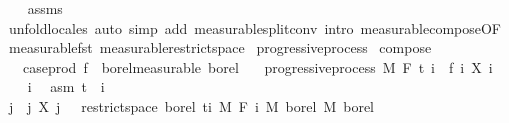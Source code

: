 \begin{isabellebody}
%
\isadelimproof
\ \ %
\endisadelimproof
%
\isatagproof
{}\isamarkupfalse%
\ assms\ \isamarkupfalse%
\ {\isacharparenleft}{\kern0pt}unfold{\isacharunderscore}{\kern0pt}locales{\isacharparenright}{\kern0pt}\ {\isacharparenleft}{\kern0pt}auto\ simp\ add{\isacharcolon}{\kern0pt}\ measurable{\isacharunderscore}{\kern0pt}split{\isacharunderscore}{\kern0pt}conv\ intro{\isacharbang}{\kern0pt}{\isacharcolon}{\kern0pt}\ measurable{\isacharunderscore}{\kern0pt}compose{\isacharbrackleft}{\kern0pt}OF\ measurable{\isacharunderscore}{\kern0pt}fst{\isacharbrackright}{\kern0pt}\ measurable{\isacharunderscore}{\kern0pt}restrict{\isacharunderscore}{\kern0pt}space{}{\isacharparenright}{\kern0pt}%
\endisatagproof
{\isafoldproof}%
%
\isadelimproof
\isanewline
%
\endisadelimproof
\isanewline
{}\isamarkupfalse%
\ progressive{\isacharunderscore}{\kern0pt}process\isanewline
{}\isanewline
\isanewline
{}\isamarkupfalse%
\ compose{\isacharcolon}{\kern0pt}\isanewline
\ \ \ {\isachardoublequoteopen}case{\isacharunderscore}{\kern0pt}prod\ f\ {\isasymin}\ borel{\isacharunderscore}{\kern0pt}measurable\ borel{\isachardoublequoteclose}\isanewline
\ \ \ {\isachardoublequoteopen}progressive{\isacharunderscore}{\kern0pt}process\ M\ F\ t\ {\isacharparenleft}{\kern0pt}{\isasymlambda}i\ {\isasymxi}{\isachardot}{\kern0pt}\ {\isacharparenleft}{\kern0pt}f\ i{\isacharparenright}{\kern0pt}\ {\isacharparenleft}{\kern0pt}X\ i\ {\isasymxi}{\isacharparenright}{\kern0pt}{\isacharparenright}{\kern0pt}{\isachardoublequoteclose}\isanewline
%
\isadelimproof
%
\endisadelimproof
%
\isatagproof
{}\isamarkupfalse%
\isanewline
\ \ \isamarkupfalse%
\ i\ \isamarkupfalse%
\ asm{\isacharcolon}{\kern0pt}\ {\isachardoublequoteopen}t\ {\isasymle}\ i{\isachardoublequoteclose}\isanewline
\ \ \isamarkupfalse%
\ {\isachardoublequoteopen}{\isacharparenleft}{\kern0pt}{\isasymlambda}{\isacharparenleft}{\kern0pt}j{\isacharcomma}{\kern0pt}\ {\isasymxi}{\isacharparenright}{\kern0pt}{\isachardot}{\kern0pt}\ {\isacharparenleft}{\kern0pt}j{\isacharcomma}{\kern0pt}\ X\ j\ {\isasymxi}{\isacharparenright}{\kern0pt}{\isacharparenright}{\kern0pt}\ {\isasymin}\ {\isacharparenleft}{\kern0pt}restrict{\isacharunderscore}{\kern0pt}space\ borel\ {\isacharbraceleft}{\kern0pt}ti{\isacharbraceright}{\kern0pt}\ {\isasymOtimes}\isactrlsub M\ F\ i{\isacharparenright}{\kern0pt}\ {\isasymrightarrow}\isactrlsub M\ borel\ {\isasymOtimes}\isactrlsub M\ borel{\isachardoublequoteclose}\ \isanewline

\end{isabellebody}
